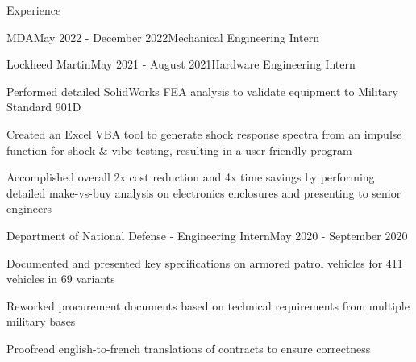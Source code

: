 \documentclass{resume} %
\newenvironment{CVmode}{\comment}{\endcomment} %
\begin{document}
\begin{rSection}{Experience}
\begin{rSubsection}{MDA}{May 2022 - December 2022}{Mechanical Engineering Intern}{}
\end{rSubsection}

\begin{CVmode}

\begin{rSubsection}{Lockheed Martin}{May 2021 - August 2021}{Hardware Engineering Intern}{}

\item Performed detailed SolidWorks FEA analysis to validate equipment to Military Standard 901D
\item Created an Excel VBA tool to generate shock response spectra from an impulse function for shock \& vibe testing, resulting in a user-friendly program
\item Accomplished overall 2x cost reduction and 4x time savings by performing detailed make-vs-buy analysis on electronics enclosures and presenting to senior engineers

\end{rSubsection}

\begin{rSubsection}{Department of National Defense - Engineering Intern}{May 2020 - September 2020}{}{}

\item Documented and presented key specifications on armored patrol vehicles for 411 vehicles in 69 variants
\item Reworked procurement documents based on technical requirements from multiple military bases
\item Proofread english-to-french translations of contracts to ensure correctness

\end{rSubsection}

\end{CVmode}

\end{rSection}
\end{document}
